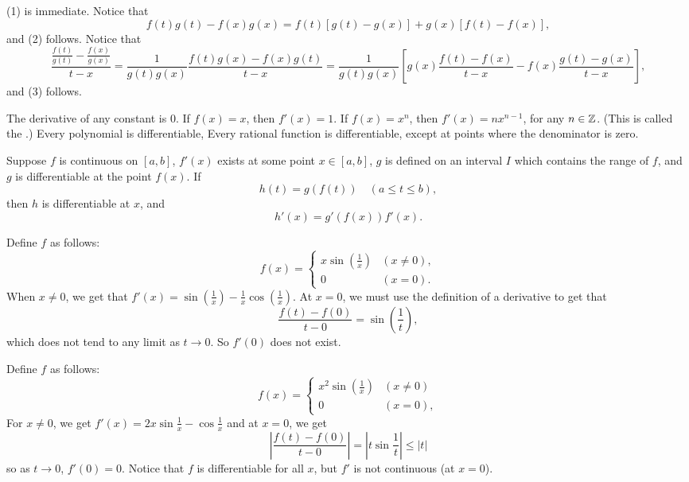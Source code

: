 \documentclass{article}
\begin{document}
\begin{remark}
    (1) is immediate. Notice that \[f(t)g(t)-f(x)g(x)=f(t)[g(t)-g(x)]+g(x)[f(t)-f(x)],\]and (2) follows. Notice that \[\frac{\frac{f(t)}{g(t)}-\frac{f(x)}{g(x)}}{t-x}=\frac{1}{g(t)g(x)}\frac{f(t)g(x)-f(x)g(t)}{t-x}=\frac{1}{g(t)g(x)}\left[g(x)\frac{f(t)-f(x)}{t-x}-f(x)\frac{g(t)-g(x)}{t-x}\right],\]and (3) follows.
\end{remark}
\begin{example}
    \listhack 
    \begin{enumerate}
        \ii The derivative of any constant is 0.
        \ii If $f(x)=x$, then $f'(x)=1$.
        \ii If $f(x)=x^{n}$, then $f'(x)=nx^{n-1}$, for any $n\in\mathbb Z$. (This is called the .)
        \ii Every polynomial is differentiable,
        \ii Every rational function is differentiable, except at points where the denominator is zero.
        
    \end{enumerate}
\end{example}
\begin{theorem}
    Suppose $f$ is continuous on $[a,b]$, $f'(x)$ exists at some point $x\in[a,b]$, $g$ is defined on an interval $I$ which contains the range of $f$, and $g$ is differentiable at the point $f(x)$. If
    \[h(t)=g(f(t))\quad(a\leq t\leq b),\]then $h$ is differentiable at $x$, and 
    \[h'(x)=g'(f(x))f'(x).\]
\end{theorem}
\begin{example}
    Define $f$ as follows:
    \[f(x)=\begin{cases}
        x\sin(\frac{1}{x}) & (x\neq 0),\\
        0 & (x=0).
    \end{cases}\]
    When $x\neq 0$, we get that $f'(x)=\sin(\frac{1}{x})-\frac{1}{x}\cos(\frac{1}{x})$. At $x=0$, we must use the definition of a derivative to get that \[\frac{f(t)-f(0)}{t-0}=\sin\left(\frac{1}{t}\right),\]which does not tend to any limit as $t\rightarrow 0$. So $f'(0)$ does not exist.
\end{example}
\begin{example}
    Define $f$ as follows:
    \[f(x)=\begin{cases}
        x^{2}\sin(\frac{1}{x}) & (x\neq 0)\\
        0 & (x=0),
    \end{cases}\]For $x\neq 0$, we get $f'(x)=2x\sin\frac{1}{x}-\cos\frac{1}{x}$ and at $x=0$, we get \[\left|\frac{f(t)-f(0)}{t-0}\right|=\left|t\sin\frac{1}{t}\right|\leq|t|\]so as $t\rightarrow 0$, $f'(0)=0$. Notice that $f$ is differentiable for all $x$, but $f'$ is not continuous (at $x=0$).
\end{example}
\end{document}
